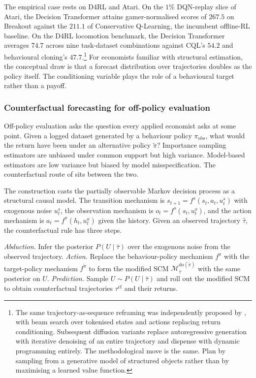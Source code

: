 The empirical case rests on D4RL and Atari. On the $1\%$ DQN-replay slice
of Atari, the Decision Transformer attains gamer-normalised scores of
$267.5$ on Breakout against the $211.1$ of Conservative Q-Learning, the
incumbent offline-RL baseline. On the D4RL locomotion benchmark, the
Decision Transformer averages $74.7$ across nine task-dataset
combinations against CQL's $54.2$ and behavioural cloning's
$47.7$.\footnote{The same trajectory-as-sequence reframing was independently
proposed by \citet{Janner2021TT}, with beam search over tokenised states
and actions replacing return conditioning. Subsequent diffusion variants
\citep{Janner2022diffuser,Ajay2023} replace autoregressive generation with
iterative denoising of an entire trajectory and dispense with dynamic
programming entirely. The methodological move is the same. Plan by
sampling from a generative model of structured objects rather than by
maximising a learned value function.} For economists familiar with
structural estimation, the conceptual draw is that a forecast distribution
over trajectories doubles as the policy itself. The conditioning variable
plays the role of a behavioural target rather than a payoff.

\subsubsection{Counterfactual forecasting for off-policy evaluation}
\label{sec:counterfactual_ope}

Off-policy evaluation asks the question every applied economist asks at
some point. Given a logged dataset generated by a behaviour policy
$\pi_{\mathrm{obs}}$, what would the return have been under an alternative
policy $\widetilde\pi$? Importance sampling estimators are unbiased under
common support but high variance. Model-based estimators are low variance
but biased by model misspecification. The counterfactual route of
\citet{Buesing2019} sits between the two.

The construction casts the partially observable Markov decision process as
a structural causal model. The transition mechanism is
$s_{t+1} = f^s(s_t, a_t, u^s_t)$ with exogenous noise $u^s_t$, the
observation mechanism is $o_t = f^o(s_t, u^o_t)$, and the action
mechanism is $a_t = f^\pi(h_t, u^a_t)$ given the history. Given an
observed trajectory $\hat\tau$, the counterfactual rule has three steps.

\begin{algorithm}[h]
\caption{Counterfactual off-policy evaluation \citep{Buesing2019}}
\label{alg:buesing_cfope}
\begin{algorithmic}[1]
\State \emph{Abduction.} Infer the posterior $P(U \mid \hat\tau)$ over the
exogenous noise from the observed trajectory.
\State \emph{Action.} Replace the behaviour-policy mechanism $f^\pi$ with
the target-policy mechanism $f^{\widetilde\pi}$ to form the modified SCM
$\mathcal M^{\mathrm{do}(\widetilde\pi)}_{\hat\tau}$ with the same posterior
on $U$.
\State \emph{Prediction.} Sample $U \sim P(U \mid \hat\tau)$ and roll out
the modified SCM to obtain counterfactual trajectories $\tau^{\mathrm{cf}}$
and their returns.
\end{algorithmic}
\end{algorithm}

